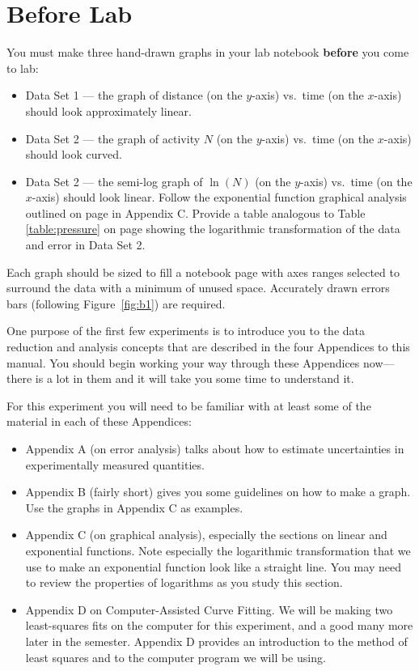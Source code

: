 \newexp

\section*{Before Lab}
You must make three hand-drawn graphs in your lab notebook
{\bf before} you come to lab: 
\begin{itemize}
\item Data Set 1 --- the graph of distance (on the $y$-axis) vs.\ time (on the
$x$-axis) should look approximately linear.
\item Data Set 2 --- the graph of activity $N$ (on the $y$-axis) vs.\ time (on the
$x$-axis) should look curved.
\item Data Set 2 --- the semi-log graph of $\ln(N)$ (on the $y$-axis) vs.\ time (on the
$x$-axis) should look linear.  Follow the exponential function graphical
analysis outlined on page \pageref{exprel} in Appendix C. 
Provide a table analogous to Table \ref{table:pressure} on page
\pageref{table:pressure} showing the logarithmic transformation of the data and error
in Data Set 2.
\end{itemize}
Each graph should be sized to fill a notebook
page with axes ranges selected to surround the data with a minimum of unused space.
Accurately drawn errors bars (following Figure~\ref{fig:b1}) are required.


One purpose of the first few experiments is to introduce you to
the data reduction and analysis concepts that are described in the
four Appendices to this manual.  You should begin working your way
through these Appendices now---there is a lot in them and it will take
you some time to understand it.

For this experiment you will need to be familiar with at least some
of the material in each of these Appendices:
\begin{itemize}
\item Appendix A (on error analysis) talks about how to estimate uncertainties
in experimentally measured quantities.
\item Appendix B (fairly short) gives you some guidelines on how to make a graph.
Use the graphs in Appendix C as examples.
%
\item Appendix C (on graphical analysis), especially the sections on linear
and exponential functions.  Note especially the logarithmic transformation that we
use to make an exponential function look like a straight line.  You may need
to review the properties of logarithms as you study this section.
%
\item Appendix D on Computer-Assisted Curve Fitting.  We will be making
two least-squares fits on the computer for this experiment, and a good many
more later in the semester.  Appendix D provides an introduction to
the method of least squares and to the computer program we will be
using.
\end{itemize}

